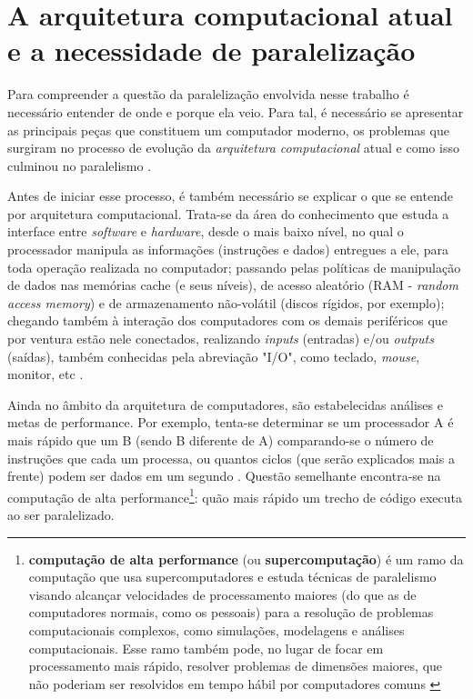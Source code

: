     
\chapter{A arquitetura computacional atual e a necessidade de paralelização}

    Para compreender a questão da paralelização envolvida nesse trabalho é 
    necessário entender de onde e porque ela veio. Para tal, é necessário 
    se apresentar as principais peças que constituem um computador moderno, 
    os problemas que surgiram no processo de evolução da \textit{arquitetura 
    computacional}  atual e como isso 
	culminou no paralelismo \cite{LLNL:parcomp}.

    Antes de iniciar esse processo, é também necessário se explicar o que se 
    entende por arquitetura computacional. Trata-se da área do conhecimento 
    que estuda a interface entre \textit{software} e \textit{hardware}, desde 
    o mais baixo nível, no qual o processador manipula as informações 
    (instruções e dados) entregues a ele, para toda operação realizada no 
    computador; passando pelas políticas de manipulação de dados nas memórias 
    cache (e seus níveis), de acesso aleatório (RAM - \textit{random access 
    memory}) e de armazenamento não-volátil (discos rígidos, por exemplo); 
    chegando também à interação dos computadores com os demais periféricos que 
    por ventura estão nele conectados, realizando \textit{inputs} (entradas) 
    e/ou \textit{outputs} (saídas), também conhecidas pela abreviação "I/O", 
    como teclado, \textit{mouse}, monitor, etc \cite{Catsoulis}.
    
    Ainda no âmbito da arquitetura de computadores, são estabelecidas análises e 
    metas de performance. Por exemplo, tenta-se determinar se um processador A é 
    mais rápido que um B (sendo B diferente de A) comparando-se o número de 
    instruções que cada um processa, ou quantos ciclos (que serão explicados mais 
    a frente) podem ser dados em um segundo \cite{wiki:comparch}. 
    Questão semelhante encontra-se na 
    computação de alta performance\footnote{\textbf{computação de alta performance} 
    (ou \textbf{supercomputação}) é um ramo da computação que usa supercomputadores 
    e estuda técnicas de paralelismo visando alcançar velocidades de processamento 
    maiores (do que as de computadores normais, como os pessoais) para a resolução de 
    problemas computacionais complexos, como simulações, 
    modelagens e análises computacionais. Esse ramo também pode, no lugar de focar 
    em processamento mais rápido, resolver problemas de dimensões maiores, que não 
    poderiam ser resolvidos em tempo hábil por computadores comuns \cite{techo:hpc}}: 
    quão mais rápido um trecho de código executa ao ser paralelizado.
   
